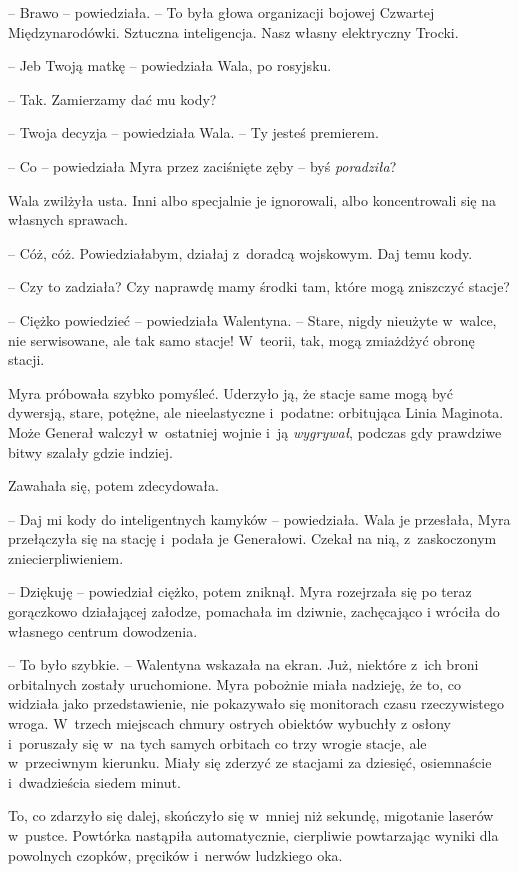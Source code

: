 \documentclass[oneside,polish,11pt,sfheadings]{mwbk}
\begin{document}
-- Brawo -- powiedziała. -- To była głowa
organizacji bojowej Czwartej Międzynarodówki. Sztuczna inteligencja.
Nasz własny elektryczny Trocki.

-- Jeb Twoją matkę -- powiedziała Wala, po rosyjsku.

-- Tak. Zamierzamy dać mu kody?

-- Twoja decyzja -- powiedziała Wala. -- Ty jesteś premierem.

-- Co -- powiedziała Myra przez zaciśnięte zęby -- byś \textit{poradziła}?

Wala zwilżyła usta. Inni albo specjalnie je ignorowali, albo
koncentrowali się na własnych sprawach.

-- Cóż, cóż. Powiedziałabym, działaj z~doradcą wojskowym. Daj temu kody.

-- Czy to zadziała? Czy naprawdę mamy środki tam, które mogą zniszczyć
stacje?

-- Ciężko powiedzieć -- powiedziała Walentyna. -- Stare, nigdy nieużyte w~walce, nie serwisowane, ale tak samo stacje! W~teorii, tak, mogą
zmiażdżyć obronę stacji.

Myra próbowała szybko pomyśleć. Uderzyło ją, że stacje same mogą być
dywersją, stare, potężne, ale nieelastyczne i~podatne: orbitująca Linia
Maginota. Może Generał walczył w~ostatniej wojnie i~ją \textit{wygrywał},
podczas gdy prawdziwe bitwy szalały gdzie indziej.

Zawahała się, potem zdecydowała.

-- Daj mi kody do inteligentnych kamyków -- powiedziała. Wala je
przesłała, Myra przełączyła się na stację i~podała je Generałowi. Czekał
na nią, z~zaskoczonym zniecierpliwieniem.

-- Dziękuję -- powiedział ciężko, potem zniknął. Myra rozejrzała się po
teraz gorączkowo działającej załodze, pomachała im dziwnie, zachęcająco
i wróciła do własnego centrum dowodzenia.

-- To było szybkie. -- Walentyna wskazała na ekran. Już, niektóre z~ich
broni orbitalnych zostały uruchomione. Myra pobożnie miała nadzieję, że
to, co widziała jako przedstawienie, nie pokazywało się monitorach czasu
rzeczywistego wroga. W~trzech miejscach chmury ostrych obiektów wybuchły
z osłony i~poruszały się w~na tych samych orbitach co trzy wrogie
stacje, ale w~przeciwnym kierunku. Miały się zderzyć ze stacjami za
dziesięć, osiemnaście i~dwadzieścia siedem minut.

To, co zdarzyło się dalej, skończyło się w~mniej niż sekundę, migotanie
laserów w~pustce. Powtórka nastąpiła automatycznie, cierpliwie
powtarzając wyniki dla powolnych czopków, pręcików i~nerwów ludzkiego
oka.
\end{document}
